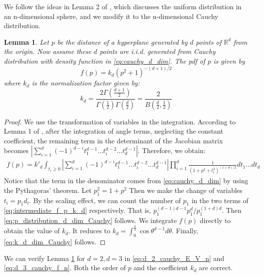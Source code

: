 \documentclass{article}
\newtheorem{lemma}{Lemma}
\def\R{\mathbb{R}}
\begin{document}
We follow the ideas in Lemma 2 of \cite{raynaud1970enveloppe},
which discusses the uniform distribution in an n-dimensional sphere,
and we modify it to the n-dimensional Cauchy distribution.
\begin{lemma}\label{lem:p_distribution_d_dim_Cauchy}
    Let $p$ be the distance of a hyperplane generated by $d$ points of $\R^d$ from the origin.
    Now assume these $d$ points are i.i.d. generated from Cauchy distribution with density
    function in \eqref{eq:cauchy_d_dim}.
    The pdf of $p$ is given by
    \begin{equation}\label{eq:p_distribution_d_dim_Cauchy}
        f(p) = k_d (p^2+1)^{-(d+1)/2}
    \end{equation}
    where $k_d$ is the normalization factor given by:
    \begin{equation}\label{eq:k_d_dim_Cauchy}
        k_d = \frac{2 \Gamma \left(\frac{d+1}{2} \right)}{
            \Gamma(\frac{1}{2})
            \Gamma(\frac{d}{2})
        } = \frac{2}{B(\frac{d}{2}, \frac{1}{2})}
    \end{equation}
\end{lemma}
\begin{proof}
    We use the transformation of variables in the integration.
    According to Lemma 1 of  \cite{raynaud1970enveloppe},
    after the integration of angle terms, neglecting the constant coefficient,
    the remaining term in the determinant of the Jacobian matrix becomes
    $|\sum_{i=1}^d (-1)^{d-i} t^{d-1}_1 \dots 
    t^{d-2}_i \dots t^{d-1}_d|$.
    Therefore, we obtain:
    \begin{align}\label{eq:intermediate_f_p_k_d}
        f(p) = k'_d \int_{t_i\geq 0}|\sum_{i=1}^d (-1)^{d-i} t^{d-1}_1 \dots 
        t^{d-2}_i \dots t^{d-1}_d|
        \prod_{i=1}^d \frac{1}{(1+p^2+t_i^2)^{(1+d)/2}}dt_1 \dots dt_d
    \end{align}
    Notice that the term in the denominator
    comes from \eqref{eq:cauchy_d_dim} by using
    the Pythagoras' theorem.
    Let $p_1^2=1+p^2$
    Then we make the change of variables $t_i = p_1d_i$.
    By the scaling effect, we can count the number of $p_1$
    in the two terms of \eqref{eq:intermediate_f_p_k_d}
    respectively. That is, $p_1^{(d-1)d-1}p_1^d / p_1^{(1+d)d}$.
    Then \eqref{eq:p_distribution_d_dim_Cauchy} follows.
    We integrate $f(p)$ directly to obtain the value of $k_d$.
    It reduces to $k_d=\int_0^{\frac{\pi}{2}} \cos\theta^{d-1} d\theta$.
    Finally, \eqref{eq:k_d_dim_Cauchy} follows.
\end{proof}
We can verify Lemma \ref{lem:p_distribution_d_dim_Cauchy}
for $d=2,d=3$ in \eqref{eq:d_2_cauchy_E_V_n} and \eqref{eq:d_3_cauchy_f_n}.
Both the order of $p$ and the coefficient $k_d$ are correct.
\end{document}
